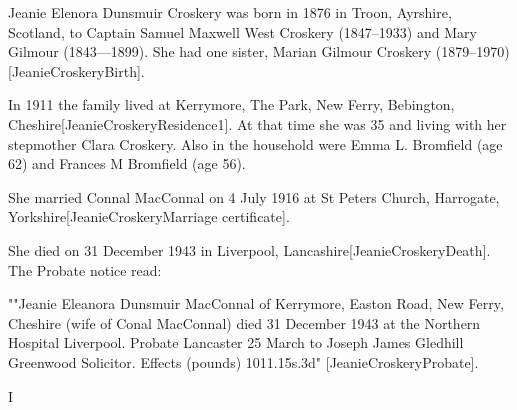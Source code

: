 
Jeanie Elenora Dunsmuir Croskery was born in 1876 in Troon, Ayrshire, Scotland, to Captain Samuel Maxwell West Croskery (1847--1933) and Mary Gilmour (1843---1899). She had one sister, Marian Gilmour Croskery (1879--1970)[JeanieCroskeryBirth].

In 1911 the family lived at Kerrymore, The Park, New Ferry, Bebington, Cheshire[JeanieCroskeryResidence1]. At that time she was 35 and living with her stepmother Clara Croskery.  Also in the household were Emma L. Bromfield (age 62) and Frances M Bromfield (age 56). 

She married Connal MacConnal on 4 July 1916 at St Peters Church, Harrogate, Yorkshire[JeanieCroskeryMarriage certificate].


She died on 31 December 1943 in	Liverpool, Lancashire[JeanieCroskeryDeath].  The Probate notice read:

""Jeanie Eleanora Dunsmuir MacConnal of Kerrymore, Easton Road, New Ferry, Cheshire (wife of Conal MacConnal) died 31 December 1943 at the Northern Hospital Liverpool. Probate Lancaster 25 March to Joseph James Gledhill Greenwood Solicitor. Effects (pounds) 1011.15s.3d" [JeanieCroskeryProbate].

I
